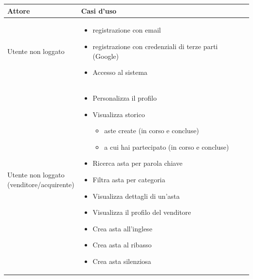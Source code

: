 {
	\setlength{\tabcolsep}{10pt} %
	\renewcommand{\arraystretch}{1.5} %

	\begin{tabular}{|l|p{330pt}|}
		\hline
		\textbf{Attore}    & \textbf{Casi d'uso}                                        \\ \hline
		Utente non loggato & \begin{itemize}[leftmargin=15pt]
			                     \setlength{\itemsep}{0pt}  %
			                     \setlength{\parskip}{0pt}  %
			                     \item registrazione con email
			                     \item registrazione con credenziali di terze parti (Google)
			                     \item Accesso al sistema
		                     \end{itemize} \\ \hline
		\makecell{Utente non loggato                                                    \\ (venditore/acquirente)} &
		\begin{itemize}[leftmargin=15pt]
			\setlength{\itemsep}{0pt}  %
			\setlength{\parskip}{0pt}  %
			\item Personalizza il profilo
			\item Visualizza storico
			      \begin{itemize}
				      \item aste create (in corso e concluse)
				      \item a cui hai partecipato (in corso e concluse)
			      \end{itemize}
			\item Ricerca asta per parola chiave
			\item Filtra asta per categoria
			\item Visualizza dettagli di un'asta
			\item Visualizza il profilo del venditore

		\end{itemize}\medskip

		\begin{itemize}[leftmargin=15pt]
			\setlength{\itemsep}{0pt}  %
			\setlength{\parskip}{0pt}  %
			\item Crea asta all'inglese
			\item Crea asta al ribasso
			\item Crea asta silenziosa
		\end{itemize}\medskip


\end{tabular}}
